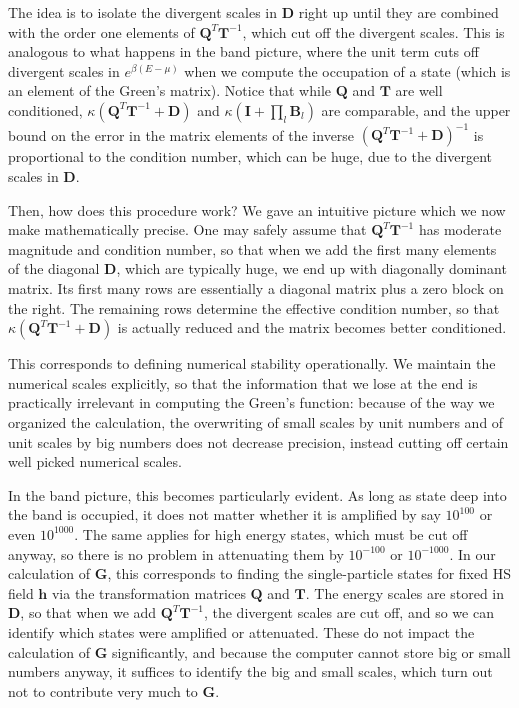 The idea is to isolate the divergent scales in $\bm D$ right up until they are combined with the order one elements of $\bm Q^T \bm T^{-1}$, which cut off the divergent scales.
This is analogous to what happens in the band picture, where the unit term cuts off divergent scales in $e^{\beta ( E - \mu )}$ when we compute the occupation of a state (which is an element of the Green's matrix).
Notice that while $\bm Q$ and $\bm T$ are well conditioned, $\kappa ( \bm Q^T \bm T^{-1} + \bm D )$ and $\kappa ( \bm I + \prod_l \bm B_l )$ are comparable, and the upper bound on the error in the matrix elements of the inverse $( \bm Q^T \bm T^{-1} + \bm D )^{-1}$ is proportional to the condition number, which can be huge, due to the divergent scales in $\bm D$.

Then, how does this procedure work?
We gave an intuitive picture which we now make mathematically precise.
One may safely assume that $\bm Q^T \bm T^{-1}$ has moderate magnitude and condition number, so that when we add the first many elements of the diagonal $\bm D$, which are typically huge, we end up with diagonally dominant matrix.
Its first many rows are essentially a diagonal matrix plus a zero block on the right.
The remaining rows determine the effective condition number, so that $\kappa ( \bm Q^T \bm T^{-1} + \bm D )$ is actually reduced and the matrix becomes better conditioned.

This corresponds to defining numerical stability operationally.
We maintain the numerical scales explicitly, so that the information that we lose at the end is practically irrelevant in computing the Green's function: because of the way we organized the calculation, the overwriting of small scales by unit numbers and of unit scales by big numbers does not decrease precision, instead cutting off certain well picked numerical scales.

In the band picture, this becomes particularly evident.
As long as state deep into the band is occupied, it does not matter whether it is amplified by say $10^{100}$ or even $10^{1000}$.
The same applies for high energy states, which must be cut off anyway, so there is no problem in attenuating them by $10^{-100}$ or $10^{-1000}$.
In our calculation of $\bm G$, this corresponds to finding the single-particle states for fixed HS field $\bm h$ via the transformation matrices $\bm Q$ and $\bm T$.
The energy scales are stored in $\bm D$, so that when we add $\bm Q^T \bm T^{-1}$, the divergent scales are cut off, and so we can identify which states were amplified or attenuated.
These do not impact the calculation of $\bm G$ significantly, and because the computer cannot store big or small numbers anyway, it suffices to identify the big and small scales, which turn out not to contribute very much to $\bm G$.

